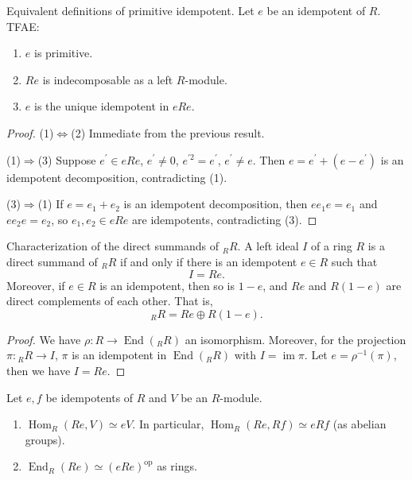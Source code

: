 \documentclass[11pt, a4paper]{report}
\begin{document}
\begin{corollary}
Equivalent definitions of primitive idempotent. Let $e$ be an idempotent of $R$. TFAE:
\begin{enumerate}
\item $e$ is primitive.
\item $Re$ is indecomposable as a left $R$-module.
\item $e$ is the unique idempotent in $eRe$.
\end{enumerate}
\end{corollary}

\begin{proof}
(1)$\Leftrightarrow$(2) Immediate from the previous result.

(1)$\Rightarrow$(3) Suppose $e^{\prime} \in eRe$, $e^{\prime} \neq 0$, $e^{\prime 2}=e^{\prime}$, $e^{\prime} \neq e$. Then $e=e^{\prime}+(e-e^{\prime})$ is an idempotent decomposition, contradicting (1).

(3)$\Rightarrow$(1) If $e=e_{1}+e_{2}$ is an idempotent decomposition, then $ee_{1}e=e_{1}$ and $ee_{2}e=e_{2}$, so $e_{1}, e_{2} \in eRe$ are idempotents, contradicting (3).
\end{proof}

\begin{proposition}
Characterization of the direct summands of ${}_{R}R$. A left ideal $I$ of a ring $R$ is a direct summand of ${}_{R}R$ if and only if there is an idempotent $e \in R$ such that
\[
I=Re.
\]
Moreover, if $e \in R$ is an idempotent, then so is $1-e$, and $Re$ and $R(1-e)$ are direct complements of each other. That is,
\[
{}_{R}R=Re \oplus R(1-e).
\]
\end{proposition}

\begin{proof}
We have $\rho: R \rightarrow \operatorname{End}({}_{R}R)$ an isomorphism. Moreover, for the projection $\pi: {}_{R}R \rightarrow I$, $\pi$ is an idempotent in $\operatorname{End}({}_{R}R)$ with $I=\operatorname{im}\pi$. Let $e=\rho^{-1}(\pi)$, then we have $I=Re$.
\end{proof}

\begin{theorem}
Let $e, f$ be idempotents of $R$ and $V$ be an $R$-module.
\begin{enumerate}
\item $\operatorname{Hom}_{R}(Re, V) \simeq eV$. In particular, $\operatorname{Hom}_{R}(Re, Rf) \simeq eRf$ (as abelian groups).
\item $\operatorname{End}_{R}(Re) \simeq (eRe)^{\mathrm{op}}$ as rings.
\end{enumerate}
\end{theorem}
\end{document}
